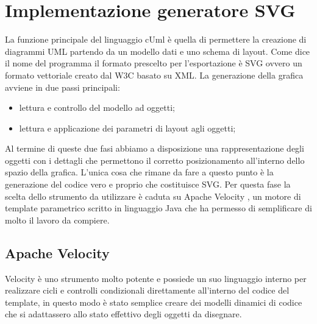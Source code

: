 \section{Implementazione generatore SVG}

La funzione principale del linguaggio cUml è quella di permettere la creazione 
di diagrammi UML partendo da un modello dati e uno schema di layout.
Come dice il nome del programma il formato prescelto per l'esportazione è SVG
\cite{svg_website} ovvero un formato vettoriale creato dal W3C
\cite{w3c_website} basato su XML.
La generazione della grafica avviene in due passi principali:
\begin{itemize}
  \item lettura e controllo del modello ad oggetti;
  \item lettura e applicazione dei parametri di layout agli oggetti;
\end{itemize}

Al termine di queste due fasi abbiamo a disposizione una rappresentazione degli
oggetti con i dettagli che permettono il corretto posizionamento all'interno
dello spazio della grafica.
L'unica cosa che rimane da fare a questo punto è la generazione del codice vero
e proprio che costituisce SVG. Per questa fase la scelta dello strumento da
utilizzare è caduta su Apache Velocity \cite{apache_velocity_website}, un motore di 
template parametrico scritto in linguaggio Java che ha permesso di semplificare
di molto il lavoro da compiere.

\subsection{Apache Velocity}
Velocity è uno strumento molto potente e possiede un suo linguaggio interno per
realizzare cicli e controlli condizionali direttamente all'interno del codice
del template, in questo modo è stato semplice creare dei modelli dinamici di
codice che si adattassero allo stato effettivo degli oggetti da disegnare.

